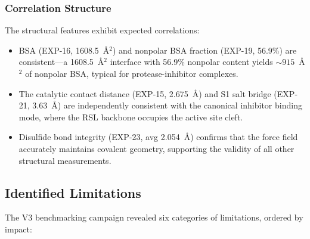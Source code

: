 \documentclass[conference]{IEEEtran}
\begin{document}
\subsubsection{Correlation Structure}

The structural features exhibit expected correlations:
\begin{itemize}
  \item BSA (EXP-16, 1608.5~\AA$^2$) and nonpolar BSA fraction (EXP-19,
    56.9\%) are consistent---a 1608.5~\AA$^2$ interface with 56.9\%
    nonpolar content yields ${\sim}915$~\AA$^2$ of nonpolar BSA, typical
    for protease-inhibitor complexes.
  \item The catalytic contact distance (EXP-15, 2.675~\AA) and S1 salt
    bridge (EXP-21, 3.63~\AA) are independently consistent with the
    canonical inhibitor binding mode, where the RSL backbone occupies the
    active site cleft.
  \item Disulfide bond integrity (EXP-23, avg 2.054~\AA) confirms that
    the force field accurately maintains covalent geometry, supporting the
    validity of all other structural measurements.
\end{itemize}

\subsection{Identified Limitations}\label{sec:v3_limitations}

The V3 benchmarking campaign revealed six categories of limitations,
ordered by impact:
\end{document}
